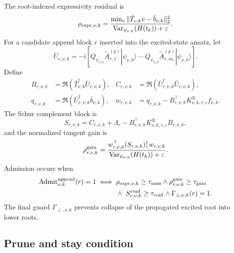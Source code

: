 \documentclass[
  reprint,
  amsmath,
  amssymb,
  aps,
  pra,
  nofootinbib,
  superscriptaddress,
  floatfix
]{revtex4-2}
\newcommand{\ii}{\mathrm{i}}
\newcommand{\app}{\mathrm{append}}
\newcommand{\Var}{\operatorname{Var}}
\newcommand{\eps}{\varepsilon}
\newcommand{\ket}[1]{|#1\rangle}
\begin{document}
The root-indexed expressivity residual is
\begin{equation}
\rho_{\rm expr,\nu,k}
=
\frac{
\min_v\|\bar T_{\nu,k}v-\bar b_{\nu,k}\|_2^2
}{
\Var_{\psi_{\nu,k}}(H(t_k))+\eps
}.
\label{eq:excited_expr_miss}
\end{equation}
For a candidate append block $r$ inserted into the excited-state ansatz, let
\begin{equation}
\bar U_{r,\nu,k}
=
-\ii
\left[
Q_{\psi_{\nu,k}}\widetilde A_{r,1}^{(p)}\ket{\psi_{\nu,k}}\ \cdots\
Q_{\psi_{\nu,k}}\widetilde A_{r,m_r}^{(p)}\ket{\psi_{\nu,k}}
\right].
\label{eq:excited_candidate_tangent}
\end{equation}
Define
\begin{align}
B_{r,\nu,k}&=\Re(\bar T_{\nu,k}^\dagger\bar U_{r,\nu,k}),
&
C_{r,\nu,k}&=\Re(\bar U_{r,\nu,k}^\dagger\bar U_{r,\nu,k}),
\nonumber\\
q_{r,\nu,k}&=\Re(\bar U_{r,\nu,k}^\dagger\bar b_{\nu,k}),
&
w_{r,\nu,k}&=q_{r,\nu,k}-B_{r,\nu,k}^\top K_{\nu,k,\tau,\eps}^{\oplus}f_{\nu,k}.
\label{eq:excited_append_parts}
\end{align}
The Schur complement block is
\begin{equation}
S_{r,\nu,k}
=
C_{r,\nu,k}+\Lambda_r
-
B_{r,\nu,k}^\top K_{\nu,k,\tau,\eps}^{\oplus}B_{r,\nu,k},
\label{eq:excited_append_schur_block}
\end{equation}
and the normalized tangent gain is
\begin{equation}
\rho_{r,\nu,k}^{\rm gain}
=
\frac{
w_{r,\nu,k}^\top(S_{r,\nu,k})_\tau^\dagger w_{r,\nu,k}
}{
\Var_{\psi_{\nu,k}}(H(t_k))+\eps
}.
\label{eq:excited_append_gain}
\end{equation}
Admission occurs when
\begin{equation}
\begin{aligned}
\operatorname{Admit}_{\nu,k}^{\app}(r)=1
\iff{}&
\rho_{\rm expr,\nu,k}\ge\tau_{\rm miss}
\wedge
\rho_{r,\nu,k}^{\rm gain}\ge\tau_{\rm gain}
\\
&\wedge\
S_{r,\nu,k}^{\rm conf}\ge\tau_{\rm conf}
\wedge
\Gamma_{\perp,\nu,k}(r)=1 .
\end{aligned}
\label{eq:excited_append_admit}
\end{equation}
The final guard $\Gamma_{\perp,\nu,k}$ prevents collapse of the propagated excited root into lower roots.

\subsection{Prune and stay condition}
\end{document}
